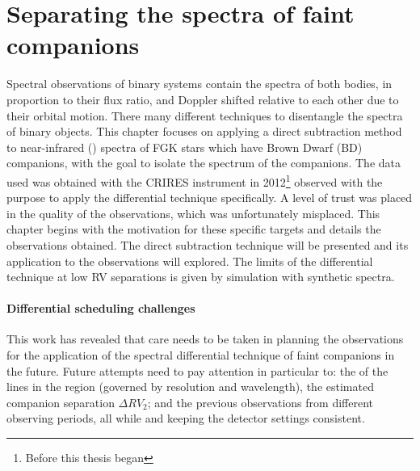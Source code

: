 
\chapter{Separating the spectra of faint companions} %
\label{cha:direct_recovery}

Spectral observations of binary systems contain the spectra of both bodies, in proportion to their flux ratio, and Doppler shifted relative to each other due to their orbital motion.
There many different techniques to disentangle the spectra of binary objects.
This chapter focuses on applying a direct subtraction method to near-infrared (\nir{}) spectra of {FGK} stars which have Brown Dwarf (BD) companions, with the goal to isolate the spectrum of the companions.
The data used was obtained with the {CRIRES} instrument in 2012\footnote{Before this thesis began} observed with the purpose to apply the differential technique specifically.
A level of trust was placed in the quality of the observations, which was unfortunately misplaced.
This chapter begins with the motivation for these specific targets and details the observations obtained.
The direct subtraction technique will be presented and its application to the observations will explored.
The limits of the differential technique at low {RV} separations is given by simulation with synthetic spectra.



















\subsubsection{Differential scheduling challenges}
\label{subsubsec:differential-schedualing}
This work has revealed that care needs to be taken in planning the observations for the application of the spectral differential technique of faint companions in the future.
Future attempts need to pay attention in particular to: the {\fwhm} of the lines in the region (governed by resolution and wavelength), the estimated companion separation \(\Delta {RV}_2\); and the previous observations from different observing periods, all while and keeping the detector settings consistent.


